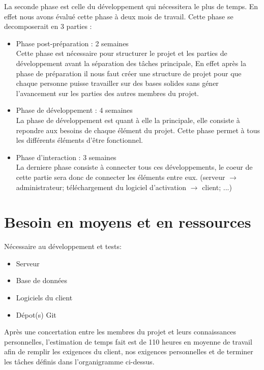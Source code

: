 La seconde phase est celle du développement qui nécessitera le plus de temps. En effet nous avons évalué cette phase à deux mois de travail.
Cette phase se decomposerait en 3 parties : \newline

\begin{itemize}
	\item Phase post-préparation : 2 semaines\\ 
	    Cette phase est nécessaire pour structurer le projet et les parties de développement avant
        la séparation des tâches principale, En effet après la phase de préparation il nous faut
        créer une structure de projet pour que chaque personne puisse travailler sur des bases
        solides sans géner l'avancement sur les parties des autres membres du projet. \newline
	\item Phase de développement : 4 semaines\\
	    La phase de développement est quant à elle la principale, elle consiste à repondre aux
        besoins de chaque élément du projet. Cette phase permet à tous les différents éléments
        d'être fonctionnel.
	\item Phase d'interaction : 3 semaines\\
	    La derniere phase consiste à connecter tous ces développements, le coeur de cette partie
        sera donc de connecter les éléments entre eux. (serveur $\rightarrow$ administrateur;
        téléchargement du logiciel d'activation $\rightarrow$ client; ...)
\end{itemize}
\newpage

\section{Besoin en moyens et en ressources}
Nécessaire au développement et tests:
\begin{itemize}
	\item Serveur
	\item Base de données
	\item Logiciels du client
	\item Dépot(s) Git\newline
\end{itemize}
\medskip

Après une concertation entre les membres du projet et leurs connaissances personnelles,
l'estimation de temps fait est de 110 heures en moyenne de travail afin de remplir les exigences
du client, nos exigences personnelles et de terminer les tâches définis	dans l'organigramme
ci-dessus.\newline
\medskip

